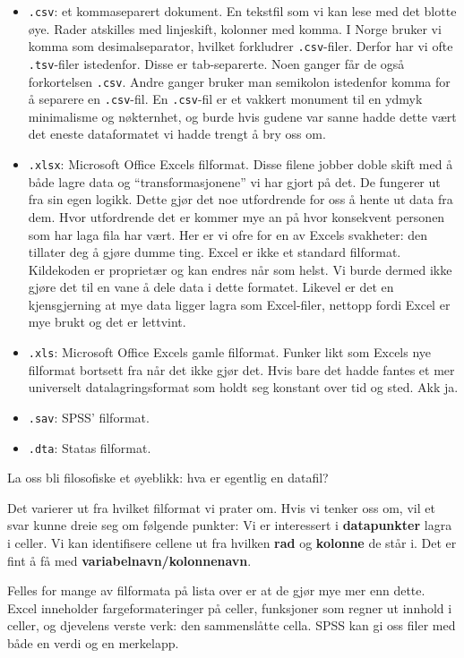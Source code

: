 \documentclass[
  letterpaper,
  DIV=11,
  numbers=noendperiod]{scrreprt}
\providecommand{\tightlist}{%
  \setlength{\itemsep}{0pt}\setlength{\parskip}{0pt}}\usepackage{longtable,booktabs,array}
\begin{document}
\begin{itemize}
\tightlist
\item
  \texttt{.csv}: et kommaseparert dokument. En tekstfil som vi kan lese
  med det blotte øye. Rader atskilles med linjeskift, kolonner med
  komma. I Norge bruker vi komma som desimalseparator, hvilket
  forkludrer \texttt{.csv}-filer. Derfor har vi ofte \texttt{.tsv}-filer
  istedenfor. Disse er tab-separerte. Noen ganger får de også
  forkortelsen \texttt{.csv}. Andre ganger bruker man semikolon
  istedenfor komma for å separere en \texttt{.csv}-fil. En
  \texttt{.csv}-fil er et vakkert monument til en ydmyk minimalisme og
  nøkternhet, og burde hvis gudene var sanne hadde dette vært det eneste
  dataformatet vi hadde trengt å bry oss om.
\item
  \texttt{.xlsx}: Microsoft Office Excels filformat. Disse filene jobber
  doble skift med å både lagre data og ``transformasjonene'' vi har
  gjort på det. De fungerer ut fra sin egen logikk. Dette gjør det noe
  utfordrende for oss å hente ut data fra dem. Hvor utfordrende det er
  kommer mye an på hvor konsekvent personen som har laga fila har vært.
  Her er vi ofre for en av Excels svakheter: den tillater deg å gjøre
  dumme ting. Excel er ikke et standard filformat. Kildekoden er
  proprietær og kan endres når som helst. Vi burde dermed ikke gjøre det
  til en vane å dele data i dette formatet. Likevel er det en
  kjensgjerning at mye data ligger lagra som Excel-filer, nettopp fordi
  Excel er mye brukt og det er lettvint.
\item
  \texttt{.xls}: Microsoft Office Excels gamle filformat. Funker likt
  som Excels nye filformat bortsett fra når det ikke gjør det. Hvis bare
  det hadde fantes et mer universelt datalagringsformat som holdt seg
  konstant over tid og sted. Akk ja.
\item
  \texttt{.sav}: SPSS' filformat.
\item
  \texttt{.dta}: Statas filformat.
\end{itemize}

La oss bli filosofiske et øyeblikk: hva er egentlig en datafil?

Det varierer ut fra hvilket filformat vi prater om. Hvis vi tenker oss
om, vil et svar kunne dreie seg om følgende punkter: Vi er interessert i
\textbf{datapunkter} lagra i celler. Vi kan identifisere cellene ut fra
hvilken \textbf{rad} og \textbf{kolonne} de står i. Det er fint å få med
\textbf{variabelnavn/kolonnenavn}.

Felles for mange av filformata på lista over er at de gjør mye mer enn
dette. Excel inneholder fargeformateringer på celler, funksjoner som
regner ut innhold i celler, og djevelens verste verk: den sammenslåtte
cella. SPSS kan gi oss filer med både en verdi og en merkelapp.
\end{document}
